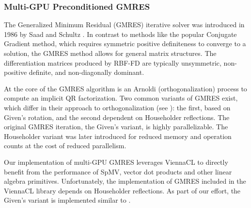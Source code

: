 %
%
%
%
%
%

\subsubsection{Multi-GPU Preconditioned GMRES}

The Generalized Minimum Residual (GMRES) iterative solver was introduced in 1986 by Saad and Schultz \cite{Saad1986}. In contrast to methods like the popular Conjugate Gradient method, which requires symmetric positive definiteness to converge to a solution, the GMRES method allows for general matrix structures. The differentiation matrices produced by RBF-FD are typically unsymmetric, non-positive definite, and non-diagonally dominant. 

At the core of the GMRES algorithm is an Arnoldi (orthogonalization) process to compute an implicit QR factorization. Two common variants of GMRES exist, which differ in their approach to orthogonalization (see \cite{Saad2003}): the first, based on Given's rotation, and the second dependent on Householder reflections. The original GMRES iteration, the Given's variant, is highly parallelizable. The Householder variant was later introduced for reduced memory and operation counts at the cost of reduced parallelism. 

Our implementation of multi-GPU GMRES leverages ViennaCL to directly benefit from the performance of SpMV, vector dot products and other linear algebra primitives. 
Unfortunately, the implementation of GMRES included in the ViennaCL library depends on Householder reflections. As part of our effort, the Given's variant is implemented similar to \cite{Bahi2011}. 

